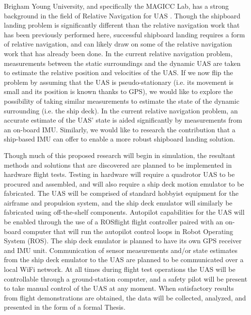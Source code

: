 \documentclass[12pt, letterpaper]{article}
\begin{document}
Brigham Young University, and specifically the MAGICC Lab, has a strong background in the field of Relative Navigation for UAS \cite{Leishman2013}.  Though the shipboard landing problem is significantly different than the relative navigation work that has been previously performed here, successful shipboard landing requires a form of relative navigation, and can likely draw on some of the relative navigation work that has already been done.  In the current relative navigation problem, measurements between the static surroundings and the dynamic UAS are taken to estimate the relative position and velocities of the UAS.  If we now flip the problem by assuming that the UAS is pseudo-stationary (i.e. its movement is small and its position is known thanks to GPS), we would like to explore the possibility of taking similar measurements to estimate the state of the dynamic surrounding (i.e. the ship deck). In the current relative navigation problem, an accurate estimate of the UAS' state is aided significantly by measurements from an on-board IMU. Similarly, we would like to research the contribution that a ship-based IMU can offer to enable a more robust shipboard landing solution.

Though much of this proposed research will begin in simulation, the resultant methods and solutions that are discovered are planned to be implemented in hardware flight tests.  Testing in hardware will require a quadrotor UAS to be procured and assembled, and will also require a ship deck motion emulator to be fabricated.  The UAS will be comprised of standard hobbyist equipment for the airframe and propulsion system, and the ship deck emulator will similarly be fabricated using off-the-shelf components.  Autopilot capabilities for the UAS will be enabled through the use of a ROSflight flight controller paired with an on-board computer that will run the autopilot control loops in Robot Operating System (ROS).  The ship deck emulator is planned to have its own GPS receiver and IMU unit.  Communication of sensor measurements and/or state estimates from the ship deck emulator to the UAS are planned to be communicated over a local WiFi network.  At all times during flight test operations the UAS will be controllable through a ground-station computer, and a safety pilot will be present to take manual control of the UAS at any moment.  When satisfactory results from flight demonstrations are obtained, the data will be collected, analyzed, and presented in the form of a formal Thesis. 
\end{document}
